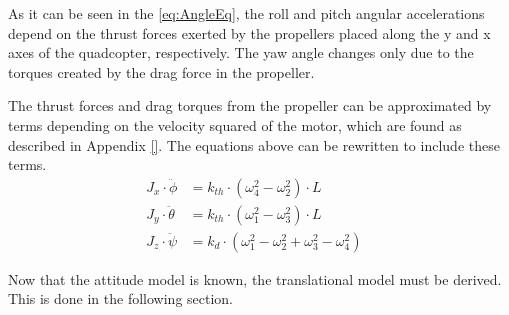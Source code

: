 
As it can be seen in the \autoref{eq:AngleEq}, the roll and pitch angular accelerations depend on the thrust forces exerted by the propellers placed along the y and x axes of the quadcopter, respectively. The yaw angle changes only due to the torques created by the drag force in the propeller.

The thrust forces and drag torques from the propeller can be approximated by terms depending on the velocity squared of the motor, which are found as described in Appendix \ref{}. The equations above can be rewritten to include these terms.
%
\begin{align}
J_x\cdot\ddot{\phi}&=k_{th} \cdot(\omega^2_4-\omega^2_2) \cdot L &\\
J_y \cdot\ddot{\theta}&=k_{th} \cdot(\omega^2_1-\omega^2_3) \cdot L &\\
J_z\cdot\ddot{\psi}&=k_d \cdot(\omega^2_1-\omega^2_2+\omega^2_3-\omega^2_4)
\label{eq:AngleEqVelocities}
\end{align}


Now that the attitude model is known, the translational model must be derived. This is done in the following section. 
